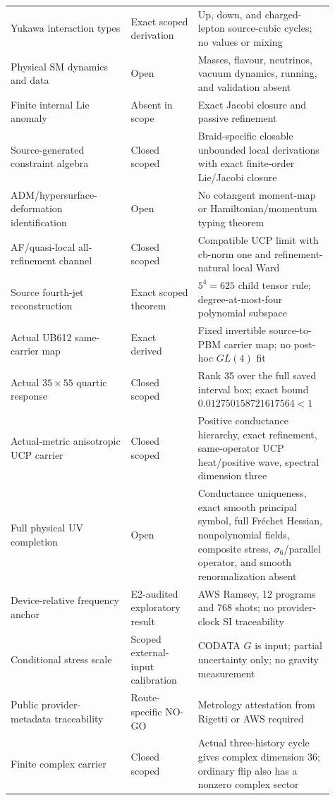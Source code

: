 \documentclass[11pt]{article}
\theoremstyle{definition}
\theoremstyle{remark}
\begin{document}
\begin{longtable}{>{\raggedright\arraybackslash}p{0.34\linewidth} >{\raggedright\arraybackslash}p{0.19\linewidth} >{\raggedright\arraybackslash}p{0.38\linewidth}}
Yukawa interaction types & Exact scoped derivation & Up, down, and charged-lepton source-cubic cycles; no values or mixing \\
Physical SM dynamics and data & Open & Masses, flavour, neutrinos, vacuum dynamics, running, and validation absent \\
Finite internal Lie anomaly & Absent in scope & Exact Jacobi closure and passive refinement \\
Source-generated constraint algebra & Closed scoped & Braid-specific closable unbounded local derivations with exact finite-order Lie/Jacobi closure \\
ADM/hypersurface-deformation identification & Open & No cotangent moment-map or Hamiltonian/momentum typing theorem \\
AF/quasi-local all-refinement channel & Closed scoped & Compatible UCP limit with cb-norm one and refinement-natural local Ward \\
Source fourth-jet reconstruction & Exact scoped theorem & $5^4=625$ child tensor rule; degree-at-most-four polynomial subspace \\
Actual UB612 same-carrier map & Exact derived & Fixed invertible source-to-PBM carrier map; no post-hoc $GL(4)$ fit \\
Actual $35\times55$ quartic response & Closed scoped & Rank 35 over the full saved interval box; exact bound $0.012750158721617564<1$ \\
Actual-metric anisotropic UCP carrier & Closed scoped & Positive conductance hierarchy, exact refinement, same-operator UCP heat/positive wave, spectral dimension three \\
Full physical UV completion & Open & Conductance uniqueness, exact smooth principal symbol, full Fr\'echet Hessian, nonpolynomial fields, composite stress, $\sigma_6$/parallel operator, and smooth renormalization absent \\
Device-relative frequency anchor & E2-audited exploratory result & AWS Ramsey, 12 programs and 768 shots; no provider-clock SI traceability \\
Conditional stress scale & Scoped external-input calibration & CODATA $G$ is input; partial uncertainty only; no gravity measurement \\
Public provider-metadata traceability & Route-specific NO-GO & Metrology attestation from Rigetti or AWS required \\
Finite complex carrier & Closed scoped & Actual three-history cycle gives complex dimension 36; ordinary flip also has a nonzero complex sector \\

\end{longtable}
\end{document}
